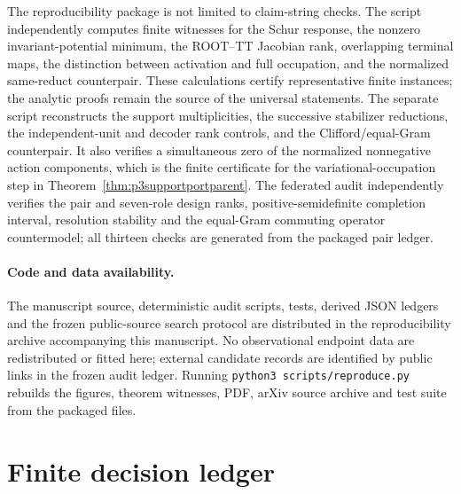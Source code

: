 \documentclass[11pt]{article}
\begin{document}
The reproducibility package is not limited to claim-string checks.  The script
 independently computes finite
witnesses for the Schur response, the nonzero invariant-potential minimum, the
ROOT--TT Jacobian rank, overlapping terminal maps, the distinction between
activation and full occupation, and the normalized same-reduct counterpair.
These calculations certify representative finite instances; the analytic
proofs remain the source of the universal statements.  The separate script
 reconstructs the support
multiplicities, the successive stabilizer reductions, the independent-unit
and decoder rank controls, and the Clifford/equal-Gram counterpair.  It also
verifies a simultaneous zero of the normalized nonnegative action components,
which is the finite certificate for the variational-occupation step in
Theorem~\ref{thm:p3supportportparent}.
The federated audit independently verifies the pair and seven-role design
ranks, positive-semidefinite completion interval, resolution stability and
the equal-Gram commuting operator countermodel; all thirteen checks are
generated from the packaged pair ledger.

\paragraph{Code and data availability.}
The manuscript source, deterministic audit scripts, tests, derived JSON
ledgers and the frozen public-source search protocol are distributed in the
reproducibility archive accompanying this manuscript.  No observational
endpoint data are redistributed or fitted here; external candidate records
are identified by public links in the frozen audit ledger.  Running
\texttt{python3 scripts/reproduce.py} rebuilds the figures, theorem witnesses,
PDF, arXiv source archive and test suite from the packaged files.

\section{Finite decision ledger}
\end{document}
